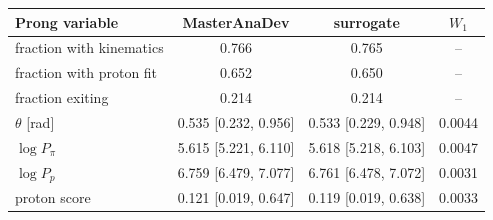 \begin{tabular}{lccc}
\toprule
Prong variable & MasterAnaDev & surrogate & $W_1$ \\
\midrule
fraction with kinematics & 0.766 & 0.765 & -- \\
fraction with proton fit & 0.652 & 0.650 & -- \\
fraction exiting & 0.214 & 0.214 & -- \\
$\theta$ [rad] & 0.535 [0.232, 0.956] & 0.533 [0.229, 0.948] & 0.0044 \\
$\log P_\pi$ & 5.615 [5.221, 6.110] & 5.618 [5.218, 6.103] & 0.0047 \\
$\log P_p$ & 6.759 [6.479, 7.077] & 6.761 [6.478, 7.072] & 0.0031 \\
proton score & 0.121 [0.019, 0.647] & 0.119 [0.019, 0.638] & 0.0033 \\
\bottomrule
\end{tabular}

